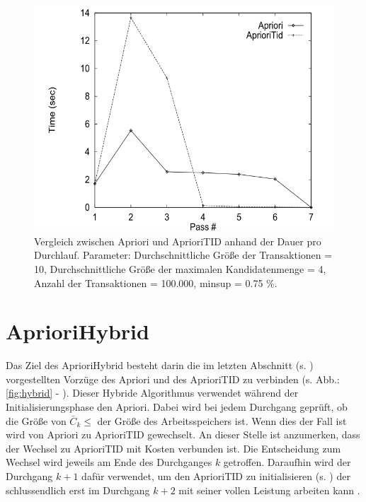 \begin{figure}[h]
\centering
\includegraphics[width=0.7\linewidth]{./images/aprioriVsAprioriTDI}
\caption[Apriori vs AprioriTID]{Vergleich zwischen Apriori und AprioriTID anhand der Dauer pro Durchlauf. Parameter:  Durchschnittliche Größe der Transaktionen = 10, Durchschnittliche Größe der maximalen Kandidatenmenge = 4, Anzahl der Transaktionen = 100.000, minsup = 0.75 \%. \parencite[Quelle:][3.6 Algorithm AprioriHybrid - Figure 6]{IBM}}
\label{fig:aprioriVsAprioriTDI}
\end{figure}


\section{AprioriHybrid}
Das Ziel des AprioriHybrid besteht darin die im letzten Abschnitt (s. ) vorgestellten Vorzüge  des Apriori und des AprioriTID zu verbinden (s. Abb.: \ref{fig:hybrid} - ). 
Dieser Hybride Algorithmus verwendet während der Initialisierungsphase den Apriori. 
Dabei wird bei jedem Durchgang geprüft, ob die Größe von $\bar{C}_k \leq$ der Größe des Arbeitsspeichers ist.
Wenn dies der Fall ist wird von Apriori zu AprioriTID gewechselt.
An dieser Stelle ist anzumerken, dass der Wechsel zu AprioriTID mit Kosten verbunden ist. 
Die Entscheidung zum Wechsel wird jeweils am Ende des Durchganges $k$ getroffen. 
Daraufhin wird der Durchgang $k+1$ dafür verwendet, um den AprioriTID zu initialisieren (s. ) der schlussendlich erst im Durchgang $k+2$ mit seiner vollen Leistung arbeiten kann \parencite[s.][3.6 Algorithm AprioriHybrid]{IBM}.


